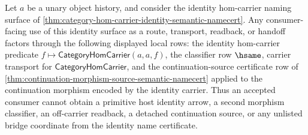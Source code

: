 \begin{lemma}
\label{lem:category-hom-identity-semantic-namecert-bridge-determinacy}
Let $a$ be a unary object history, and consider the identity hom-carrier naming
surface of \autoref{thm:category-hom-carrier-identity-semantic-namecert}. Any
consumer-facing use of this identity surface as a route, transport, readback, or
handoff factors through the following displayed local rows: the identity
hom-carrier predicate $f\mapsto\mathsf{CategoryHomCarrier}(a,a,f)$, the
classifier row $\hsame$, carrier transport for
$\mathsf{CategoryHomCarrier}$, and the continuation-source certificate row of
\autoref{thm:continuation-morphism-source-semantic-namecert} applied to the
continuation morphism encoded by the identity carrier. Thus an accepted consumer
cannot obtain a primitive host identity arrow, a second morphism classifier, an
off-carrier readback, a detached continuation source, or any unlisted bridge
coordinate from the identity name certificate.
\end{lemma}
